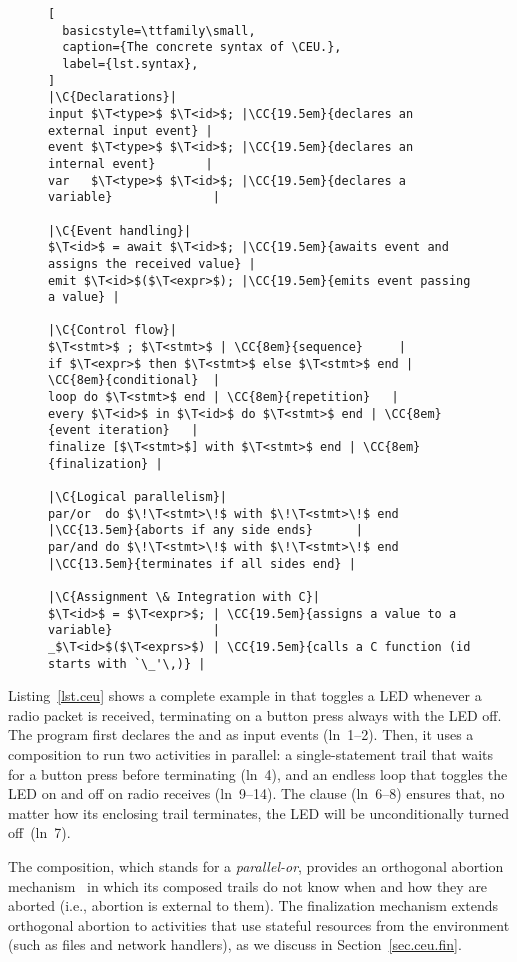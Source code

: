 \def\C#1{\rmfamily\itshape//~#1}
\def\CC#1#2{\hfill\makebox[#1][l]{\C{#2}}}
\def\T<#1>{\langle\mathit{#1}\rangle}
\bgroup
\begin{figure}
\begin{lstlisting}[
  basicstyle=\ttfamily\small,
  caption={The concrete syntax of \CEU.},
  label={lst.syntax},
]
|\C{Declarations}|
input $\T<type>$ $\T<id>$; |\CC{19.5em}{declares an external input event} |
event $\T<type>$ $\T<id>$; |\CC{19.5em}{declares an internal event}       |
var   $\T<type>$ $\T<id>$; |\CC{19.5em}{declares a variable}              |

|\C{Event handling}|
$\T<id>$ = await $\T<id>$; |\CC{19.5em}{awaits event and assigns the received value} |
emit $\T<id>$($\T<expr>$); |\CC{19.5em}{emits event passing a value} |

|\C{Control flow}|
$\T<stmt>$ ; $\T<stmt>$ | \CC{8em}{sequence}     |
if $\T<expr>$ then $\T<stmt>$ else $\T<stmt>$ end | \CC{8em}{conditional}  |
loop do $\T<stmt>$ end | \CC{8em}{repetition}   |
every $\T<id>$ in $\T<id>$ do $\T<stmt>$ end | \CC{8em}{event iteration}   |
finalize [$\T<stmt>$] with $\T<stmt>$ end | \CC{8em}{finalization} |

|\C{Logical parallelism}|
par/or  do $\!\T<stmt>\!$ with $\!\T<stmt>\!$ end |\CC{13.5em}{aborts if any side ends}      |
par/and do $\!\T<stmt>\!$ with $\!\T<stmt>\!$ end |\CC{13.5em}{terminates if all sides end} |

|\C{Assignment \& Integration with C}|
$\T<id>$ = $\T<expr>$; | \CC{19.5em}{assigns a value to a variable}              |
_$\T<id>$($\T<exprs>$) | \CC{19.5em}{calls a C function (id starts with `\_'\,)} |
\end{lstlisting}
\end{figure}
\egroup

Listing~\ref{lst.ceu} shows a complete example in \CEU that toggles a LED
whenever a radio packet is received, terminating on a button press always
with the LED off.
%
The program first declares the  and  as
input events (ln~1--2).
Then, it uses a  composition to run two activities in parallel:
a single-statement trail that waits for a button press before terminating
(ln~4), and an endless loop that toggles the LED on and off on radio receives
(ln~9--14).
The  clause (ln~6--8) ensures that, no matter how its enclosing
trail terminates, the LED will be unconditionally turned off~(ln~7).

The  composition, which stands for a \emph{parallel-or}, provides
an orthogonal abortion mechanism~\cite{esterel.preemption} in which its
composed trails do not know when and how they are aborted (i.e., abortion is
external to them).
%
%
The finalization mechanism extends orthogonal abortion to %
activities that use stateful resources from the environment (such as files and
network handlers), as we discuss in Section~\ref{sec.ceu.fin}.
%

